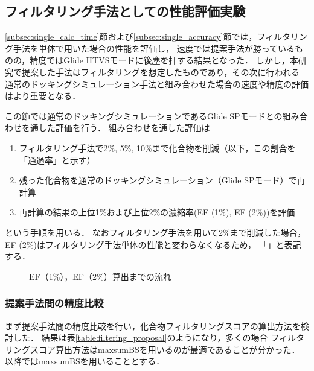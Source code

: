 \newpage

\subsection{フィルタリング手法としての性能評価実験}
\ref{subsec:single_calc_time}節および\ref{subsec:single_accuracy}節では，フィルタリング手法を単体で用いた場合の性能を評価し，
速度では提案手法が勝っているものの，精度ではGlide HTVSモードに後塵を拝する結果となった．
しかし，本研究で提案した手法はフィルタリングを想定したものであり，その次に行われる
通常のドッキングシミュレーション手法と組み合わせた場合の速度や精度の評価はより重要となる．


この節では通常のドッキングシミュレーションであるGlide SPモードとの組み合わせを通した評価を行う．
組み合わせを通した評価は
\begin{enumerate}
\item フィルタリング手法で2\%, 5\%, 10\%まで化合物を削減（以下，この割合を「通過率」と示す）
\item 残った化合物を通常のドッキングシミュレーション（Glide SPモード）で再計算
\item 再計算の結果の上位1\%および上位2\%の濃縮率(EF (1\%), EF (2\%))を評価
\end{enumerate}
という手順を用いる．
なおフィルタリング手法を用いて2\%まで削減した場合，EF (2\%)はフィルタリング手法単体の性能と変わらなくなるため，
「\textendash」と表記する．

\begin{figure}[htp]
 \begin{center}
  \caption{EF（1\%），EF（2\%）算出までの流れ}
  \label{fig:filtering_image}
 \end{center}
\end{figure}

\newpage

\subsubsection{提案手法間の精度比較}\label{subsubsec:filtering_proposal}
まず提案手法間の精度比較を行い，化合物フィルタリングスコアの算出方法を検討した．
結果は表\ref{table:filtering_proposal}のようになり，多くの場合
フィルタリングスコア算出方法はmaxsumBSを用いるのが最適であることが分かった．
以降ではmaxsumBSを用いることとする．

